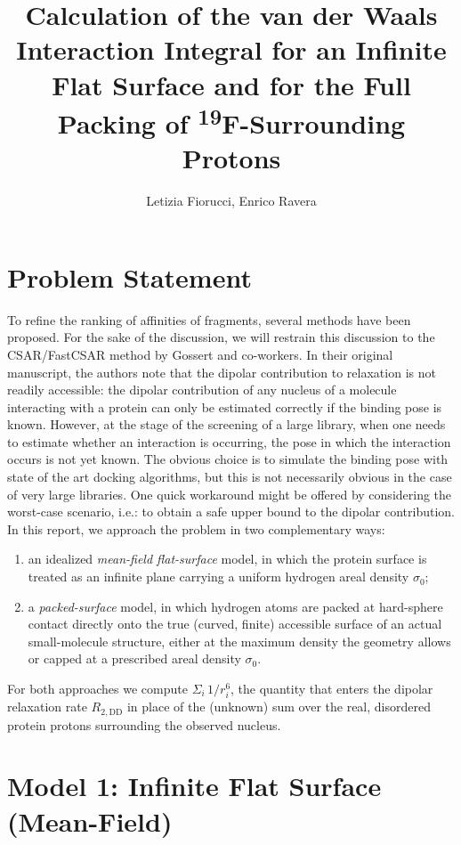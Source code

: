 \documentclass[11pt]{article}
\title{Calculation of the van der Waals Interaction Integral for an Infinite Flat Surface and for the Full Packing of \textsuperscript{19}F-Surrounding Protons}
\author{Letizia Fiorucci, Enrico Ravera}
\date{}
\begin{document}
\maketitle
\section{Problem Statement}
To refine the ranking of affinities of fragments, several methods have been proposed. For the sake of the discussion, we will restrain this discussion to the CSAR/FastCSAR method by Gossert and co-workers. In their original manuscript, the authors note that the dipolar contribution to relaxation is not readily accessible: the dipolar contribution of any nucleus of a molecule interacting with a protein can only be estimated correctly if the binding pose is known. However, at the stage of the screening of a large library, when one needs to estimate whether an interaction is occurring, the pose in which the interaction occurs is not yet known. The obvious choice is to simulate the binding pose with state of the art docking algorithms, but this is not necessarily obvious in the case of very large libraries. One quick workaround might be offered by considering the worst-case scenario, i.e.: to obtain a safe upper bound to the dipolar contribution. In this report, we approach the problem in two complementary ways:

\begin{enumerate}
  \item an idealized \emph{mean-field flat-surface} model, in which the protein surface is treated as an infinite plane carrying a uniform hydrogen areal density $\sigma_0$;
  \item a \emph{packed-surface} model, in which hydrogen atoms are packed at hard-sphere contact directly onto the true (curved, finite) accessible surface of an actual small-molecule structure, either at the maximum density the geometry allows or capped at a prescribed areal density $\sigma_0$.
\end{enumerate}

For both approaches we compute $\Sigma_i\, 1/r_i^6$, the quantity that enters the dipolar relaxation rate $R_{2,\mathrm{DD}}$ in place of the (unknown) sum over the real, disordered protein protons surrounding the observed nucleus.

\section{Model 1: Infinite Flat Surface (Mean-Field)}
\end{document}

